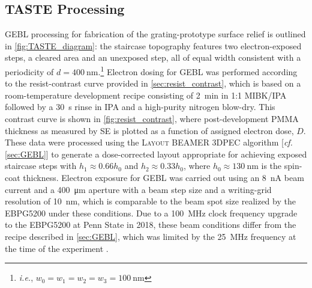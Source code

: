 \subsection{TASTE Processing}\label{sec:prototype_TASTE_process}
GEBL processing for fabrication of the grating-prototype surface relief is outlined in \cref{fig:TASTE_diagram}: the staircase topography features two electron-exposed steps, a cleared area and an unexposed step, all of equal width consistent with a periodicity of $d = \SI{400}{\nm}$.\footnote{\emph{i.e.}, $w_0 = w_1 = w_2 = w_3 = \SI{100}{\nm}$} 
Electron dosing for GEBL was performed according to the resist-contrast curve provided in \cref{sec:resist_contrast}, which is based on a room-temperature development recipe consisting of \SI{2}{\minute} in 1:1 MIBK/IPA followed by a \SI{30}{\second} rinse in IPA and a high-purity nitrogen blow-dry. 
This contrast curve is shown in \cref{fig:resist_contrast}, where post-development PMMA thickness as measured by SE is plotted as a function of assigned electron dose, $D$. 
These data were processed using the \textsc{Layout BEAMER 3DPEC} algorithm [\emph{cf.\@} \cref{sec:GEBL}] to generate a dose-corrected layout appropriate for achieving exposed staircase steps with $h_1 \approx 0.66 h_0$ and $h_2 \approx 0.33 h_0$, where $h_0 \approx \SI{130}{\nm}$ is the spin-coat thickness. 
Electron exposure for GEBL was carried out using an \SI{8}{\nano\ampere} beam current and a \SI{400}{\um} aperture with a beam step size and a writing-grid resolution of \SI{10}{\nm}, which is comparable to the beam spot size realized by the \textsc{EBPG5200} under these conditions. 
Due to a \SI{100}{\mega\hertz} clock frequency upgrade to the \textsc{EBPG5200} at Penn State in 2018, these beam conditions differ from the recipe described in \cref{sec:GEBL}, which was limited by the \SI{25}{\mega\hertz} frequency at the time of the experiment \cite{McCoy18,McCoy20}. %


